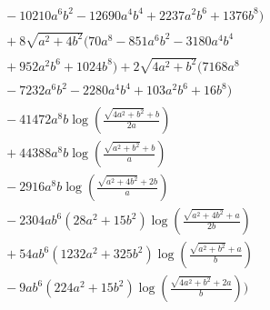 \begin{align*}
&\phantom{{}=\frac{1}{120960 a^{4} b^{2}}\Bigg(}- 10210 a^{6} b^{2} - 12690 a^{4} b^{4} + 2237 a^{2} b^{6} + 1376 b^{8}\bigr)\\
&\phantom{{}=\frac{1}{120960 a^{4} b^{2}}\Bigg(}+ 8 \sqrt{a^{2} + 4 b^{2}}\bigl(70 a^{8} - 851 a^{6} b^{2} - 3180 a^{4} b^{4}\\
&\phantom{{}=\frac{1}{120960 a^{4} b^{2}}\Bigg(}+ 952 a^{2} b^{6} + 1024 b^{8}\bigr) + 2 \sqrt{4 a^{2} + b^{2}}\bigl(7168 a^{8}\\
&\phantom{{}=\frac{1}{120960 a^{4} b^{2}}\Bigg(}- 7232 a^{6} b^{2} - 2280 a^{4} b^{4} + 103 a^{2} b^{6} + 16 b^{8}\bigr)\\
&\phantom{{}=\frac{1}{120960 a^{4} b^{2}}\Bigg(}- 41472 a^{8} b \log\left(\frac{\sqrt{4 a^{2} + b^{2}} + b}{2 a}\right)\\
&\phantom{{}=\frac{1}{120960 a^{4} b^{2}}\Bigg(}+ 44388 a^{8} b \log\left(\frac{\sqrt{a^{2} + b^{2}} + b}{a}\right)\\
&\phantom{{}=\frac{1}{120960 a^{4} b^{2}}\Bigg(}- 2916 a^{8} b \log\left(\frac{\sqrt{a^{2} + 4 b^{2}} + 2 b}{a}\right)\\
&\phantom{{}=\frac{1}{120960 a^{4} b^{2}}\Bigg(}- 2304 a b^{6} \left(28 a^{2} + 15 b^{2}\right) \log\left(\frac{\sqrt{a^{2} + 4 b^{2}} + a}{2 b}\right)\\
&\phantom{{}=\frac{1}{120960 a^{4} b^{2}}\Bigg(}+ 54 a b^{6} \left(1232 a^{2} + 325 b^{2}\right) \log\left(\frac{\sqrt{a^{2} + b^{2}} + a}{b}\right)\\
&\phantom{{}=\frac{1}{120960 a^{4} b^{2}}\Bigg(}- 9 a b^{6} \left(224 a^{2} + 15 b^{2}\right) \log\left(\frac{\sqrt{4 a^{2} + b^{2}} + 2 a}{b}\right)\Bigg)
\end{align*}
